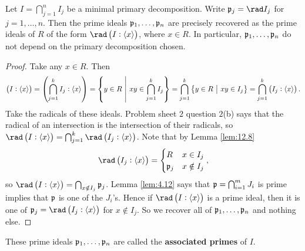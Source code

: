 \begin{theorem}
Let $ I = \bigcap_{j = 1}^n I_j $ be a minimal primary decomposition. Write $ \ppp_j = \rad I_j $ for $ j = 1, \dots, n $. Then the prime ideals $ \mathfrak{p}_1, \dots, \mathfrak{p}_n $ are precisely recovered as the prime ideals of $ R $ of the form $ \rad \br{I : \abr{x}} $, where $ x \in R $. In particular, $ \mathfrak{p}_1, \dots, \mathfrak{p}_n $ do not depend on the primary decomposition chosen.
\end{theorem}


\begin{proof}
Take any $ x \in R $. Then
$$ \br{I : \abr{x}} = \br{\bigcap_{j = 1}^k I_j : \abr{x}} = \cbr{y \in R \st xy \in \bigcap_{j = 1}^k I_j} = \bigcap_{j = 1}^k \cbr{y \in R \st xy \in I_j} = \bigcap_{j = 1}^k \br{I_j : \abr{x}}. $$
Take the radicals of these ideals. Problem sheet $ 2 $ question $ 2 $(b) says that the radical of an intersection is the intersection of their radicals, so $ \rad \br{I : \abr{x}} = \bigcap_{j = 1}^k \rad \br{I_j : \abr{x}} $. Note that by Lemma \ref{lem:12.8}
$$ \rad \br{I_j : \abr{x}} =
\begin{cases}
R & x \in I_j \\
\ppp_j & x \notin I_j
\end{cases},
$$
so $ \rad \br{I : \abr{x}} = \bigcap_{x \notin I_j} \ppp_j $. Lemma \ref{lem:4.12} says that $ \mathfrak{p} = \bigcap_{i = 1}^m J_i $ is prime implies that $ \mathfrak{p} $ is one of the $ J_i $'s. Hence if $ \rad \br{I : \abr{x}} $ is a prime ideal, then it is one of $ \ppp_j = \rad \br{I_j : \abr{x}} $ for $ x \notin I_j $. So we recover all of $ \mathfrak{p}_1, \dots, \mathfrak{p}_n $ and nothing else.
\end{proof}

\begin{remark*}
These prime ideals $ \mathfrak{p}_1, \dots, \mathfrak{p}_n $ are called the \textbf{associated primes} of $ I $.
\end{remark*}

